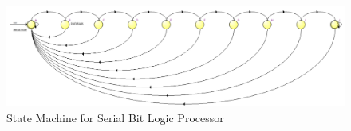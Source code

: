 \documentclass[journal, twocolumn, final,11pt,letterpaper]{IEEEtran}
\begin{document}
\begin{figure} [htbp]
	\centering
	\includegraphics[scale=0.4]{state-machine-processor.png}
	\caption{State Machine for Serial Bit Logic Processor \label{fig:serial-processor-state-machine}}
\end{figure}



\end{document}

